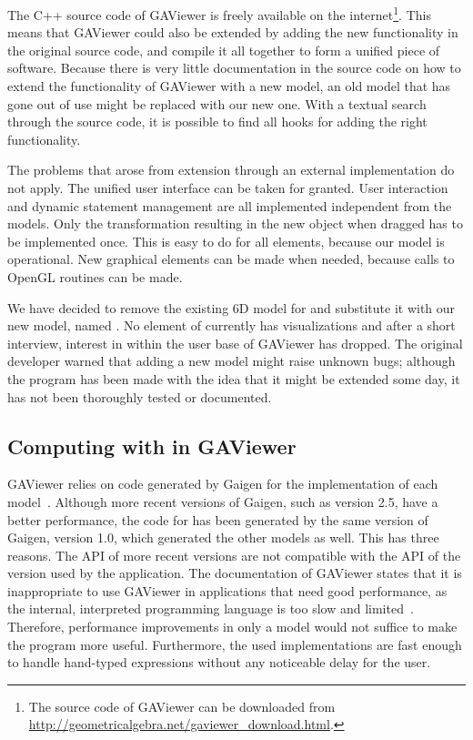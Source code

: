 The C++ source code of GAViewer is freely available on the internet\footnote{The source code of GAViewer can be downloaded from \url{http://geometricalgebra.net/gaviewer\_download.html}.}.  This means that GAViewer could also be extended by adding the new functionality in the original source code, and compile it all together to form a unified piece of software.  Because there is very little documentation in the source code on how to extend the functionality of GAViewer with a new model, an old model that has gone out of use might be replaced with our new one.  With a textual search through the source code, it is possible to find all hooks for adding the right functionality.  

The problems that arose from extension through an external implementation do not apply.  The unified user interface can be taken for granted.  User interaction and dynamic statement management are all implemented independent from the models.  Only the transformation resulting in the new object when dragged has to be implemented once.  This is easy to do for all elements, because our model is operational.  New graphical elements can be made when needed, because calls to OpenGL routines can be made. 

We have decided to remove the existing 6D model for \iga{} and substitute it with our new model, named \lga{}.  No element of \iga{} currently has visualizations and after a short interview, interest in \iga{} within the user base of GAViewer has dropped.  The original developer warned that adding a new model might raise unknown bugs; although the program has been made with the idea that it might be extended some day, it has not been thoroughly tested or documented.

\subsection{Computing with \lga{} in GAViewer}
GAViewer relies on code generated by Gaigen for the implementation of each model~\cite{Gaigen}.  Although more recent versions of Gaigen, such as version 2.5, have a better performance, the code for \lga{} has been generated by the same version of Gaigen, version 1.0, which generated the other models as well.  This has three reasons.  The API of more recent versions are not compatible with the API of the version used by the application.  The documentation of GAViewer states that it is inappropriate to use GAViewer in applications that need good performance, as the internal, interpreted programming language is too slow and limited~\cite[page 7]{GAViewer}.  Therefore, performance improvements in only a model would not suffice to make the program more useful.  Furthermore, the used implementations are fast enough to handle hand-typed expressions without any noticeable delay for the user.

